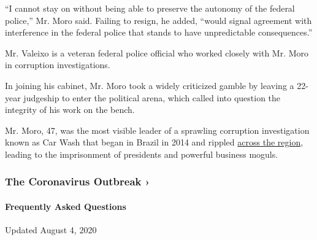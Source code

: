 ``I cannot stay on without being able to preserve the autonomy of the
federal police,'' Mr. Moro said. Failing to resign, he added, ``would
signal agreement with interference in the federal police that stands to
have unpredictable consequences.''

Mr. Valeixo is a veteran federal police official who worked closely with
Mr. Moro in corruption investigations.

In joining his cabinet, Mr. Moro took a widely criticized gamble by
leaving a 22-year judgeship to enter the political arena, which called
into question the integrity of his work on the bench.

Mr. Moro, 47, was the most visible leader of a sprawling corruption
investigation known as Car Wash that began in Brazil in 2014 and rippled
\href{https://www.nytimes.com/2017/02/13/world/americas/peru-colombia-venezuela-brazil-odebrecht-scandal.html}{across
the region}, leading to the imprisonment of presidents and powerful
business moguls.

\href{https://www.nytimes.com/news-event/coronavirus?action=click\&pgtype=Article\&state=default\&region=MAIN_CONTENT_3\&context=storylines_faq}{}

\hypertarget{the-coronavirus-outbreak-}{%
\subsubsection{The Coronavirus Outbreak
›}\label{the-coronavirus-outbreak-}}

\hypertarget{frequently-asked-questions}{%
\paragraph{Frequently Asked
Questions}\label{frequently-asked-questions}}

Updated August 4, 2020

